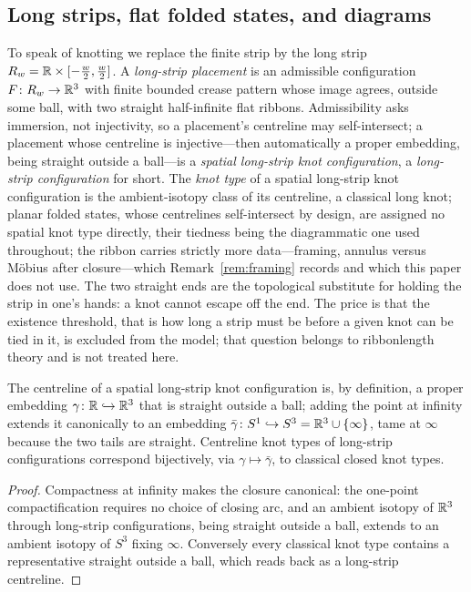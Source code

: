 \subsection{Long strips, flat folded states, and diagrams}

To speak of knotting we replace the finite strip by the long strip $R_w=\mathbb{R}\times[-\tfrac w2,\tfrac w2]$. A \emph{long-strip placement} is an admissible configuration $F\colon R_w\to\mathbb{R}^3$ with finite bounded crease pattern whose image agrees, outside some ball, with two straight half-infinite flat ribbons. Admissibility asks immersion, not injectivity, so a placement's centreline may self-intersect; a placement whose centreline is injective---then automatically a proper embedding, being straight outside a ball---is a \emph{spatial long-strip knot configuration}, a \emph{long-strip configuration} for short. The \emph{knot type} of a spatial long-strip knot configuration is the ambient-isotopy class of its centreline, a classical long knot; planar folded states, whose centrelines self-intersect by design, are assigned no spatial knot type directly, their tiedness being the diagrammatic one used throughout; the ribbon carries strictly more data---framing, annulus versus M\"obius after closure---which Remark~\ref{rem:framing} records and which this paper does not use. The two straight ends are the topological substitute for holding the strip in one's hands: a knot cannot escape off the end. The price is that the existence threshold, that is how long a strip must be before a given knot can be tied in it, is excluded from the model; that question belongs to ribbonlength theory \cite{kauffman2004,denne2020,chen2025} and is not treated here.

\begin{proposition}\label{prop:closure}
The centreline of a spatial long-strip knot configuration is, by definition, a proper embedding $\gamma\colon\mathbb{R}\hookrightarrow\mathbb{R}^3$ that is straight outside a ball; adding the point at infinity extends it canonically to an embedding $\bar\gamma\colon S^1\hookrightarrow S^3=\mathbb{R}^3\cup\{\infty\}$, tame at $\infty$ because the two tails are straight. Centreline knot types of long-strip configurations correspond bijectively, via $\gamma\mapsto\bar\gamma$, to classical closed knot types.
\end{proposition}

\begin{proof}
Compactness at infinity makes the closure canonical: the one-point compactification requires no choice of closing arc, and an ambient isotopy of $\mathbb{R}^3$ through long-strip configurations, being straight outside a ball, extends to an ambient isotopy of $S^3$ fixing $\infty$. Conversely every classical knot type contains a representative straight outside a ball, which reads back as a long-strip centreline.
\end{proof}

